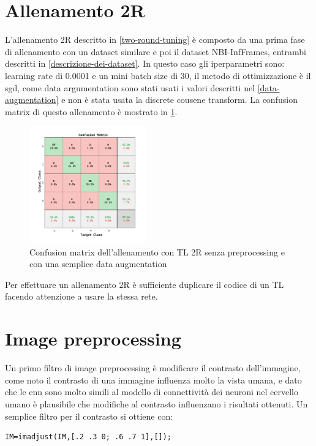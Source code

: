 \section{Allenamento 2R}\label{allenamento-2r}

L'allenamento 2R descritto in \cref{two-round-tuning} è composto da una prima fase di allenamento con un dataset similare e poi il dataset NBI-InfFrames, entrambi descritti in  \cref{descrizione-dei-dataset}. In questo caso gli iperparametri sono:   learning rate di 0.0001 e un mini batch size di 30, il metodo di ottimizzazione è il \gls{sgd}, come data argumentation sono stati usati i valori descritti nel \cref{data-augmentation} e non è stata usata la discrete cousene transform. La confusion matrix di questo allenamento è mostrato in \cref{fig:result-two-liscio}.


\begin{figure}[ht]
    \centering
    \includegraphics[width=0.45\textwidth]{addestramento-rete-neurale/two-liscio.pdf}
    \caption{Confusion matrix dell'allenamento con TL 2R senza preprocessing e con una semplice data augmentation}
    \label{fig:result-two-liscio}
\end{figure}

Per effettuare un allenamento 2R è sufficiente duplicare il codice di un TL facendo attenzione a usare la stessa rete.

\section{Image preprocessing}\label{image-preprocessing}

Un primo filtro di image preprocessing è modificare il contrasto dell'immagine, come noto il contrasto di una immagine influenza molto la vista umana, e dato che le \gls{cnn} sono molto simili al modello di connettività dei neuroni nel cervello umano è plausibile che modifiche al contrasto influenzano i risultati  ottenuti. Un semplice filtro per il contrasto si ottiene con:
\begin{lstlisting}
IM=imadjust(IM,[.2 .3 0; .6 .7 1],[]);    
\end{lstlisting}

